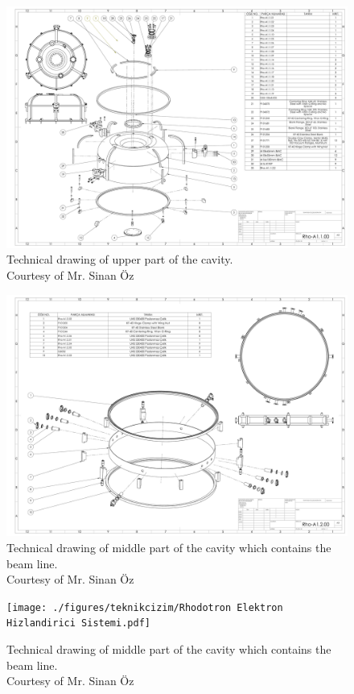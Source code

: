 \documentclass[a4paper,oneside,12pt]{report}
\numberwithin{equation}{chapter}
\begin{document}
\begin{figure}
    \centering
    \includegraphics[angle=270,origin=c, width=.98\linewidth]{./figures/teknikcizim/Rho-A1.1.00.pdf}
    \caption{Technical drawing of upper part of the cavity. \\ Courtesy of Mr. Sinan Öz}
\end{figure}

\begin{figure}
    \centering
    \includegraphics[angle=270,origin=c, width=.98\linewidth]{./figures/teknikcizim/Rho-A1.2.00.pdf}
    \caption{Technical drawing of middle part of the cavity which contains the beam line. \\ Courtesy of Mr. Sinan Öz}
\end{figure}

\begin{figure}
    \centering
    \texttt{[image: ./figures/teknikcizim/Rhodotron Elektron Hizlandirici Sistemi.pdf]}
    \caption{Technical drawing of middle part of the cavity which contains the beam line. \\ Courtesy of Mr. Sinan Öz}
\end{figure}
\end{document}
